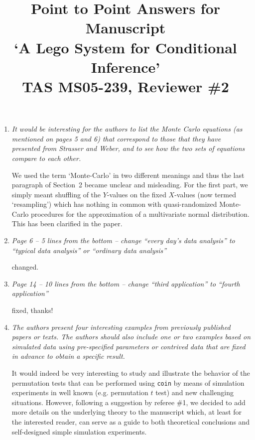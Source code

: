 \documentclass[11pt]{article}
\begin{document}
\title{Point to Point Answers for Manuscript \\
`A Lego System for Conditional Inference' \\
TAS MS05-239, Reviewer \#2}
\author{}
\maketitle

\begin{enumerate}

\item \textsl{It would be interesting for the authors to list the Monte Carlo equations
              (as mentioned on pages 5 and 6) that correspond to those that they have 
              presented from Strasser and Weber, and to see how the two sets of equations 
              compare to each other.}

We used the term `Monte-Carlo' in two different meanings and thus the last
paragraph of Section~2 became unclear and misleading. For the first part, we
simply meant shuffling of the $Y$-values on the fixed $X$-values (now
termed `resampling') which has nothing in common with quasi-randomized
Monte-Carlo procedures for the approximation of a multivariate normal
distribution. This has been clarified in the paper.

\item \textsl{Page 6 – 5 lines from the bottom – change “every day’s data analysis” to
              “typical data analysis” or “ordinary data analysis”}

changed.

\item \textsl{Page 14 – 10 lines from the bottom – change “third application” to
              “fourth application”}

fixed, thanks!

\item \textsl{The authors present four interesting examples from previously published
              papers or texts. The authors should also include one or two examples 
              based on simulated data using pre-specified
              parameters or contrived data that are fixed in advance to obtain a specific
              result.}

It would indeed be very interesting to study and illustrate the behavior of the
permutation tests that can be performed using \texttt{coin} by means of
simulation experiments in well known (e.g. permutation $t$ test) and new
challenging situations. However, following a suggestion by referee \#1, we
decided to add more details on the underlying theory to the manuscript
which, at least for the interested reader, can serve as a guide to both
theoretical conclusions and self-designed simple simulation experiments. 


\end{enumerate}
\end{document}

